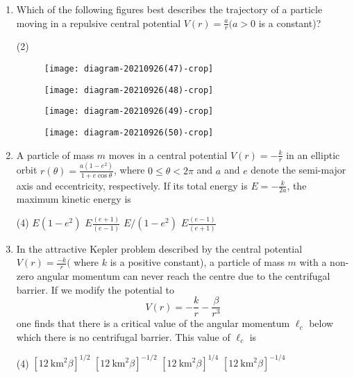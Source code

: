\begin{enumerate}
	\item Which of the following figures best describes the trajectory of a particle moving in a repulsive central potential $V(r)=\frac{a}{r}(a>0$ is a constant)?
	{}
\begin{tasks}(2)
	\task[\textbf{A.}]\begin{figure}[H]
		\centering
		\texttt{[image: diagram-20210926(47)-crop]}
	\end{figure}
	\task[\textbf{B.}]\begin{figure}[H]
		\centering
		\texttt{[image: diagram-20210926(48)-crop]}
	\end{figure}
	\task[\textbf{C.}]\begin{figure}[H]
		\centering
		\texttt{[image: diagram-20210926(49)-crop]}
	\end{figure}
	\task[\textbf{D.}]\begin{figure}[H]
		\centering
		\texttt{[image: diagram-20210926(50)-crop]}
	\end{figure}
\end{tasks}
	\item A particle of mass $m$ moves in a central potential $V(r)=-\frac{k}{r}$ in an elliptic orbit $r(\theta)=\frac{a\left(1-e^{2}\right)}{1+e \cos \theta}$, where $0 \leq \theta<2 \pi$ and $a$ and $e$ denote the semi-major axis and eccentricity, respectively. If its total energy is $E=-\frac{k}{2 a}$, the maximum kinetic energy is
	{}
\begin{tasks}(4)
	\task[\textbf{A.}] $E\left(1-e^{2}\right)$
	\task[\textbf{B.}]$E \frac{(e+1)}{(e-1)}$
	\task[\textbf{C.}]$E /\left(1-e^{2}\right)$
	\task[\textbf{D.}]$E \frac{(e-1)}{(e+1)}$
\end{tasks}
	\item In the attractive Kepler problem described by the central potential $V(r)=\frac{-k}{r}($ where $k$ is a positive constant), a particle of mass $m$ with a non-zero angular momentum can never reach the centre due to the centrifugal barrier. If we modify the potential to
	$$
	V(r)=-\frac{k}{r}-\frac{\beta}{r^{3}}
	$$
	one finds that there is a critical value of the angular momentum $\ell_{c}$ below which there is no centrifugal barrier. This value of $\ell_{c}$ is
	{}
\begin{tasks}(4)
	\task[\textbf{A.}] $\left[12 \mathrm{~km}^{2} \beta\right]^{1 / 2}$
	\task[\textbf{B.}]$\left[12 \mathrm{~km}^{2} \beta\right]^{-1 / 2}$
	\task[\textbf{C.}]$\left[12 \mathrm{~km}^{2} \beta\right]^{1 / 4}$
	\task[\textbf{D.}]$\left[12 \mathrm{~km}^{2} \beta\right]^{-1 / 4}$
\end{tasks}
 \end{enumerate}
